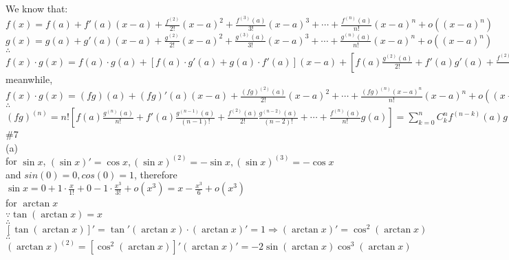 \documentclass{article}
\begin{document}
We know that: $\displaystyle f(x)=f(a)+f'(a)(x-a)+\frac{f^{(2)}}{2!}(x-a)^2+\frac{f^{(3)}(a)}{3!}(x-a)^3+\cdots+\frac{f^{(n)}(a)}{n!}(x-a)^n+o\left((x-a)^n\right)$\\

$\displaystyle g(x)=g(a)+g'(a)(x-a)+\frac{g^{(2)}}{2!}(x-a)^2+\frac{g^{(3)}(a)}{3!}(x-a)^3+\cdots+\frac{g^{(n)}(a)}{n!}(x-a)^n+o\left((x-a)^n\right)$\\

$\therefore$\qquad$\displaystyle f(x)\cdot g(x)=f(a)\cdot g(a)+\left[f(a)\cdot g'(a)+g(a)\cdot f'(a)\right](x-a)+\left[f(a)\frac{g^{(2)}(a)}{2!}+f'(a)g'(a)+\frac{f^{(2)}(a)}{2!}g(a)\right](x-a)^2+\cdots+\left[f(a)\frac{g^{(n)}(a)}{n!}+f'(a)\frac{g^{(n-1)}(a)}{(n-1)!}+\frac{f^{(2)}(a)}{2!}\frac{g^{(n-2)}(a)}{(n-2)!}+\cdots+\frac{f^{(n)}(a)}{n!}g(a)\right](x-a)^n+o\left((x-a)^n\right)$\\

meanwhile, $\displaystyle f(x)\cdot g(x)=(fg)(a)+(fg)'(a)(x-a)+\frac{(fg)^{(2)}(a)}{2!}(x-a)^2+\cdots+\frac{(fg)^{(n)}(x-a)^n}{n!}(x-a)^n+o\left((x-a)^n\right)$\\

$\therefore$\qquad$(fg)^{(n)}=n!\left[f(a)\frac{g^{(n)}(a)}{n!}+f'(a)\frac{g^{(n-1)}(a)}{(n-1)!}+\frac{f^{(2)}(a)}{2!}\frac{g^{(n-2)}(a)}{(n-2)!}+\cdots+\frac{f^{(n)}(a)}{n!}g(a)\right]=\sum \limits_{k=0}^{n}C^n_kf^{(n-k)}(a)g^{(k)}(a)$\\

\textcolor[rgb]{0.00,0.00,0.50}{\#7}\\

(a)\\

for $\sin x$, $(\sin x)'=\cos x, (\sin x)^{(2)}=-\sin x, (\sin x)^{(3)}=-\cos x$\\

and $sin(0)=0, cos(0)=1$, therefore $\sin x=0+1\cdot\displaystyle\frac{x}{1!}+0-1\cdot\frac{x^3}{3!}+o(x^3)=x-\frac{x^3}{6}+o(x^3)$\\

for $\arctan x$\\

$\because$\qquad$\tan(\arctan x)=x$\\

$\therefore$\qquad$[\tan(\arctan x)]'=\tan'(\arctan x)\cdot(\arctan x)'=1\Rightarrow(\arctan x)'=\cos^2(\arctan x)$\\

$\therefore$\qquad$(\arctan x)^{(2)}=[\cos^2(\arctan x)]'(\arctan x)'=-2\sin(\arctan x)\cos^3(\arctan x)$\\
\end{document}
